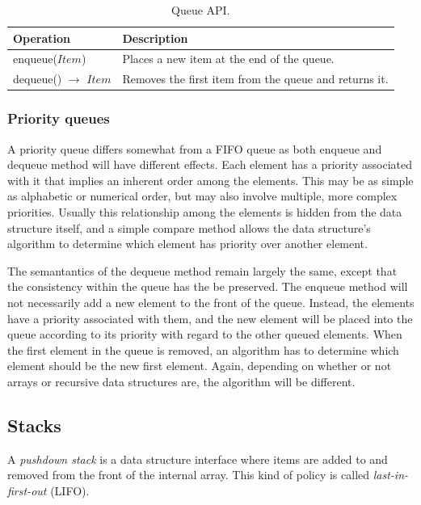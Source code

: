 \begin{table}[H]
	\caption{Queue API.}
	\label{tab:api:queue}
	\begin{tabular}{p{150px} | p{250px}}
		\textbf{Operation} & \textbf{Description} \\
		\hline
		enqueue($Item$) & Places a new item at the end of the queue. \\
		dequeue() $\rightarrow$ $Item$ & Removes the first item from the queue and returns it. \\
		\hline
	\end{tabular}
\end{table}



\subsubsection{Priority queues}

A priority queue differs somewhat from a FIFO queue as both enqueue and dequeue method will have different effects. Each element has a priority associated with it that implies an inherent order among the elements. This may be as simple as alphabetic or numerical order, but may also involve multiple, more complex priorities. Usually this relationship among the elements is hidden from the data structure itself, and a simple compare method allows the data structure's algorithm to determine which element has priority over another element.

The semantantics of the dequeue method remain largely the same, except that the consistency within the queue has the be preserved. The enqueue method will not necessarily add a new element to the front of the queue. Instead, the elements have a priority associated with them, and the new element will be placed into the queue according to its priority with regard to the other queued elements. When the first element in the queue is removed, an algorithm has to determine which element should be the new first element. Again, depending on whether or not arrays or recursive data structures are, the algorithm will be different.



\subsection{Stacks}

A \emph{pushdown stack} is a data structure interface where items are added to and removed from the front of the internal array. This kind of policy is called \emph{last-in-first-out} (LIFO).

